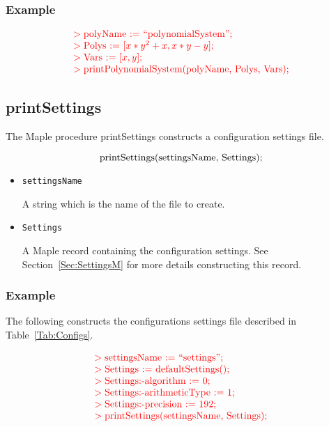 \documentclass[11pt]{report}
\begin{document}
\subsubsection{Example}

\[
\begin{color}{red}\begin{array}{l}
> \hbox{polyName := ``polynomialSystem'';} \\
> \hbox{Polys := [$x*y^2 + x, x*y - y$];} \\
> \hbox{Vars := [$x,y$];} \\
> \hbox{printPolynomialSystem(polyName, Polys, Vars);}
\end{array}\end{color}
\]

\subsection{printSettings}\label{Sec:printSettingsM}

The Maple procedure printSettings constructs a configuration settings file.

\[
\hbox{printSettings(settingsName, Settings);}
\]

\begin{itemize}

\item {\tt settingsName}

A string which is the name of the file to create.

\item {\tt Settings}

A Maple record containing the configuration settings.
See Section~\ref{Sec:SettingsM} for more details constructing
this record.

\end{itemize}

\subsubsection{Example}

The following constructs the
configurations settings file described in Table~\ref{Tab:Configs}.

\[
\begin{color}{red}\begin{array}{l}
> \hbox{settingsName := ``settings'';} \\
> \hbox{Settings := defaultSettings();} \\
> \hbox{Settings:-algorithm := 0;} \\
> \hbox{Settings:-arithmeticType := 1;} \\
> \hbox{Settings:-precision := 192;} \\
> \hbox{printSettings(settingsName, Settings);}
\end{array}\end{color}
\]
\end{document}
